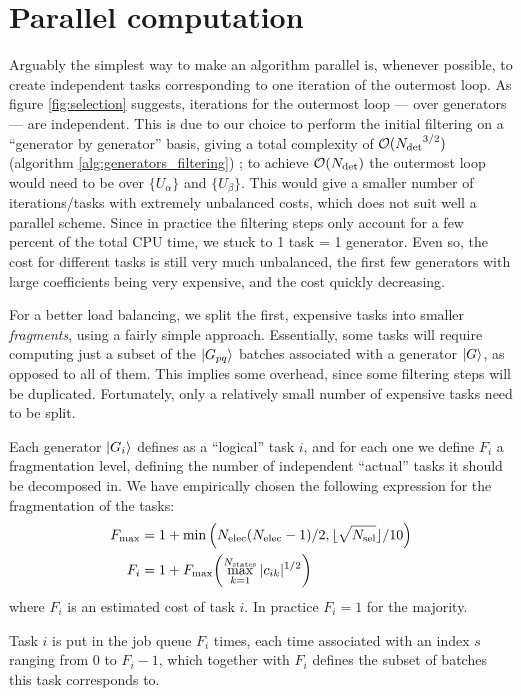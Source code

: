 \documentclass[./thesis.tex]{subfiles}
\begin{document}
\clearpage
\section{Parallel computation}

Arguably the simplest way to make an algorithm parallel is, whenever possible, to create independent tasks corresponding to one iteration of the outermost loop.
As figure \ref{fig:selection} suggests, iterations for the outermost loop --- over generators --- are independent. This is due to our choice to perform the initial filtering on a ``generator by generator'' basis, giving a total complexity of $\mathcal{O}({N_\text{det}}^{3/2})$ (algorithm \ref{alg:generators_filtering}) ; to achieve $\mathcal{O}({N_\text{det}})$ the outermost loop would need to be over $\{U_\alpha\}$ and $\{U_\beta\}$. This would give a smaller number of iterations/tasks with extremely unbalanced costs, which does not suit well a parallel scheme. Since in practice the filtering steps only account for a few percent of the total CPU time, we stuck to 1 task = 1 generator. Even so, the cost for different tasks is still very much unbalanced, the first few generators with large coefficients being very expensive, and the cost quickly decreasing.

For a better load balancing, we split the first, expensive tasks into smaller \emph{fragments}, using a fairly simple approach. Essentially, some tasks will require computing just a subset of the $\ket {G_{pq}}$ batches associated with a generator $\ket G$, as opposed to all of them. This implies some overhead, since some filtering steps will be duplicated. Fortunately, only a relatively small number of expensive tasks need to be split.


Each generator $\ket {G_i}$ defines as a ``logical'' task $i$, and for each one we define $F_i$ a fragmentation level, defining the number of independent ``actual'' tasks it should be decomposed in.
We have empirically chosen the following expression for the fragmentation of the tasks:
\begin{align}
F_{\max} & = 1 + \min \qty( {N_\text{elec}} ({N_\text{elec}}-1)/2, \lfloor \sqrt{{N_\text{sel}}} \rfloor/10 ) \\
F_i & = 1 + F_{\max} \qty( \max_{k=1}^{{N_\text{states}}} |c_{ik}|^{1/2} )
\end{align}
where $F_i$ is an estimated cost of task $i$. In practice $F_i = 1$ for the majority.

Task $i$ is put in the job queue $F_i$ times, each time associated with an index $s$ ranging from $0$ to $F_i-1$, which together with $F_i$ defines the subset of batches this task corresponds to.
 
\end{document}
